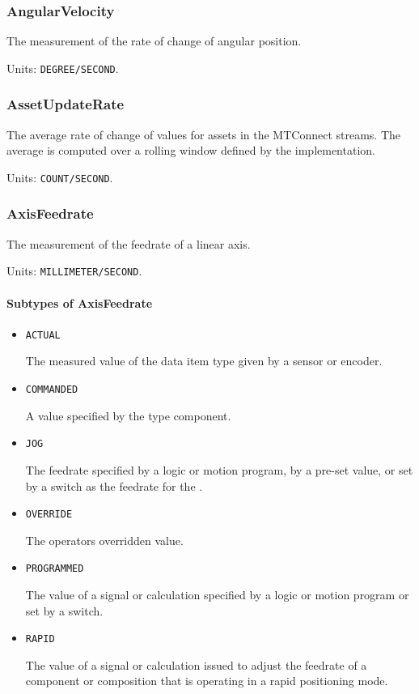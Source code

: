 \subsubsection{AngularVelocity}
\label{sec:AngularVelocity}



The measurement of the rate of change of angular position.


Units: \texttt{DEGREE/SECOND}.

\subsubsection{AssetUpdateRate}
\label{sec:AssetUpdateRate}



The average rate of change of values for assets in the MTConnect streams. The average is computed over a rolling window defined by the implementation.


Units: \texttt{COUNT/SECOND}.

\subsubsection{AxisFeedrate}
\label{sec:AxisFeedrate}



The measurement of the feedrate of a linear axis.


Units: \texttt{MILLIMETER/SECOND}.

\paragraph{Subtypes of AxisFeedrate}\mbox{}
\label{sec:Subtypes of AxisFeedrate}

\begin{itemize}

\item \texttt{ACTUAL}


The measured value of the data item type given by a sensor or encoder.

\item \texttt{COMMANDED}


A value specified by the  type component.

\item \texttt{JOG}


The feedrate specified by a logic or motion program, by a pre-set value, or set by a switch as the feedrate for the . 

\item \texttt{OVERRIDE}


The operators overridden value.

\item \texttt{PROGRAMMED}


The value of a signal or calculation specified by a logic or motion program or set by a switch.

\item \texttt{RAPID}


The value of a signal or calculation issued to adjust the feedrate of a component or composition that is operating in a rapid positioning mode.


\end{itemize}

